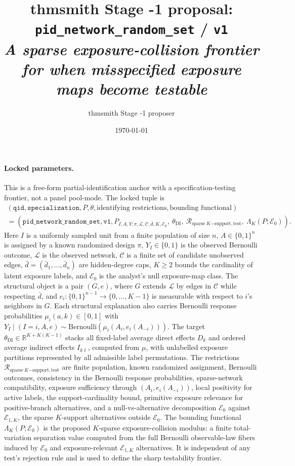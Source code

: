 \documentclass[11pt]{article}
\title{thmsmith Stage -1 proposal: \texttt{pid\_network\_random\_set} / \texttt{v1}%
  \\ \large\textit{A sparse exposure-collision frontier for when misspecified exposure maps become testable}}
\author{thmsmith Stage -1 proposer}
\date{\today}
\theoremstyle{definition}
\theoremstyle{plain}
\theoremstyle{remark}
\begin{document}
\maketitle


\paragraph{Locked parameters.}
This is a free-form partial-identification anchor with a specification-testing frontier, not a panel pool-mode.  The locked tuple is
\[
\begin{gathered}
(\texttt{qid},\texttt{specialization},P,\theta,\text{identifying restrictions},
  \text{bounding functional})\\
=
(\texttt{pid\_network\_random\_set},\texttt{v1},
P_{I,A,Y;\pi,\mathcal L,\mathcal C,\bar d,K,\mathcal E_0},\
\theta_{\mathrm{DI}},\
\mathcal R_{\mathrm{sparse}\ K\mathrm{-support,test}},\
\Lambda_K(P;\mathcal E_0)).
\end{gathered}
\]
Here \(I\) is a uniformly sampled unit from a finite population of size \(n\), \(A\in\{0,1\}^n\) is assigned by a known randomized design \(\pi\), \(Y_I\in\{0,1\}\) is the observed Bernoulli outcome, \(\mathcal L\) is the observed network, \(\mathcal C\) is a finite set of candidate unobserved edges, \(\bar d=(\bar d_1,\ldots,\bar d_n)\) are hidden-degree caps, \(K\ge2\) bounds the cardinality of latent exposure labels, and \(\mathcal E_0\) is the analyst's null exposure-map class.  The structural object is a pair \((G,e)\), where \(G\) extends \(\mathcal L\) by edges in \(\mathcal C\) while respecting \(\bar d\), and \(e_i:\{0,1\}^{n-1}\to\{0,\ldots,K-1\}\) is measurable with respect to \(i\)'s neighbors in \(G\).  Each structural explanation also carries Bernoulli response probabilities \(\mu_i(a,k)\in[0,1]\) with \(Y_I\mid(I=i,A,e)\sim\mathrm{Bernoulli}(\mu_i(A_i,e_i(A_{-i})))\).  The target \(\theta_{\mathrm{DI}}\in\mathbb R^{K+K(K-1)}\) stacks all fixed-label average direct effects \(D_k\) and ordered average indirect effects \(I_{k\ell}\), computed from \(\mu\), with unlabelled exposure partitions represented by all admissible label permutations.  The restrictions \(\mathcal R_{\mathrm{sparse}\ K\mathrm{-support,test}}\) are finite population, known randomized assignment, Bernoulli outcomes, consistency in the Bernoulli response probabilities, sparse-network compatibility, exposure sufficiency through \((A_i,e_i(A_{-i}))\), local positivity for active labels, the support-cardinality bound, primitive exposure relevance for positive-branch alternatives, and a null-vs-alternative decomposition \(\mathcal E_0\) against \(\mathcal E_{1,K}\), the sparse \(K\)-support alternatives outside \(\mathcal E_0\).  The bounding functional \(\Lambda_K(P;\mathcal E_0)\) is the proposed \(K\)-sparse exposure-collision modulus: a finite total-variation separation value computed from the full Bernoulli observable-law fibers induced by \(\mathcal E_0\) and exposure-relevant \(\mathcal E_{1,K}\) alternatives.  It is independent of any test's rejection rule and is used to define the sharp testability frontier.
\end{document}
